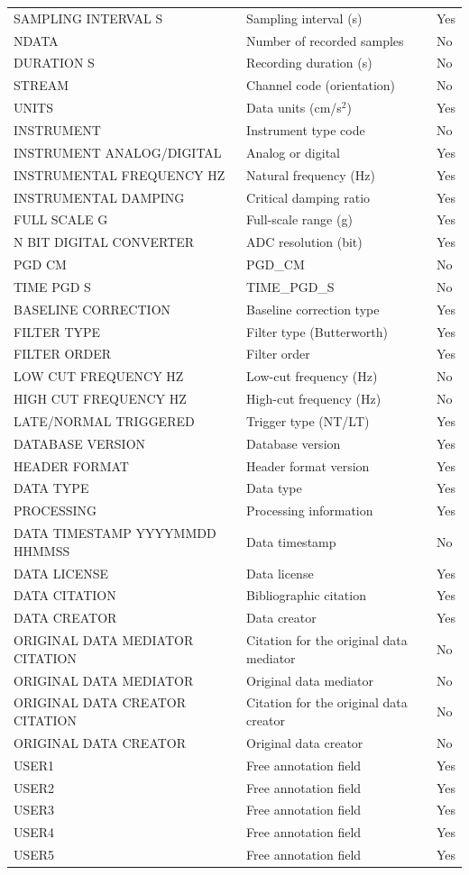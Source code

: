 \begin{longtable}{
  >{\raggedright\arraybackslash}p{4cm}  >{\raggedright\arraybackslash}p{8cm}  >{\centering\arraybackslash}p{2cm}
}
SAMPLING INTERVAL S & Sampling interval (s) & Yes \\
NDATA & Number of recorded samples & No \\
DURATION S & Recording duration (s) & No \\
STREAM & Channel code (orientation) & No \\
UNITS & Data units (cm/s$^2$) & Yes \\
INSTRUMENT & Instrument type code & No \\
INSTRUMENT ANALOG/DIGITAL & Analog or digital & Yes \\
INSTRUMENTAL FREQUENCY HZ & Natural frequency (Hz) & Yes \\
INSTRUMENTAL DAMPING & Critical damping ratio & Yes \\
FULL SCALE G & Full-scale range (g) & Yes \\
N BIT DIGITAL CONVERTER & ADC resolution (bit) & Yes \\
PGD CM & PGD_CM & No \\
TIME PGD S & TIME_PGD_S & No \\
BASELINE CORRECTION & Baseline correction type & Yes \\
FILTER TYPE & Filter type (Butterworth) & Yes \\
FILTER ORDER & Filter order & Yes \\
LOW CUT FREQUENCY HZ & Low-cut frequency (Hz) & No \\
HIGH CUT FREQUENCY HZ & High-cut frequency (Hz) & No \\
LATE/NORMAL TRIGGERED & Trigger type (NT/LT) & Yes \\
DATABASE VERSION & Database version & Yes \\
HEADER FORMAT & Header format version & Yes \\
DATA TYPE & Data type & Yes \\
PROCESSING & Processing information & Yes \\
DATA TIMESTAMP YYYYMMDD HHMMSS & Data timestamp & No \\
DATA LICENSE & Data license & Yes \\
DATA CITATION & Bibliographic citation & Yes \\
DATA CREATOR & Data creator & Yes \\
ORIGINAL DATA MEDIATOR CITATION & Citation for the original data mediator & No \\
ORIGINAL DATA MEDIATOR & Original data mediator & No \\
ORIGINAL DATA CREATOR CITATION & Citation for the original data creator & No \\
ORIGINAL DATA CREATOR & Original data creator & No \\
USER1 & Free annotation field & Yes \\
USER2 & Free annotation field & Yes \\
USER3 & Free annotation field & Yes \\
USER4 & Free annotation field & Yes \\
USER5 & Free annotation field & Yes \\
\end{longtable}